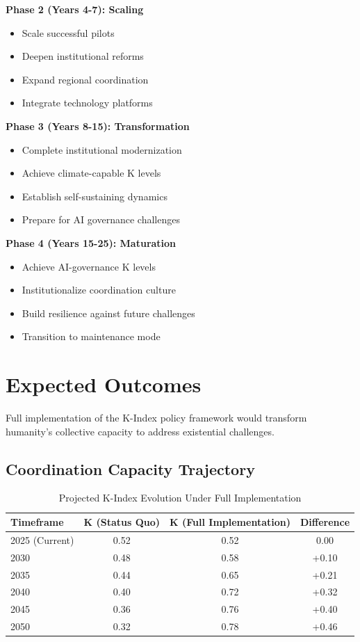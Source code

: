 \documentclass[12pt,letterpaper]{article}
\begin{document}
\textbf{Phase 2 (Years 4-7): Scaling}
\begin{itemize}
    \item Scale successful pilots
    \item Deepen institutional reforms
    \item Expand regional coordination
    \item Integrate technology platforms
\end{itemize}

\textbf{Phase 3 (Years 8-15): Transformation}
\begin{itemize}
    \item Complete institutional modernization
    \item Achieve climate-capable K levels
    \item Establish self-sustaining dynamics
    \item Prepare for AI governance challenges
\end{itemize}

\textbf{Phase 4 (Years 15-25): Maturation}
\begin{itemize}
    \item Achieve AI-governance K levels
    \item Institutionalize coordination culture
    \item Build resilience against future challenges
    \item Transition to maintenance mode
\end{itemize}

\section{Expected Outcomes}

Full implementation of the K-Index policy framework would transform humanity's collective capacity to address existential challenges.

\subsection{Coordination Capacity Trajectory}

\begin{table}[H]
\centering
\caption{Projected K-Index Evolution Under Full Implementation}
\begin{tabular}{lccc}
\toprule
\textbf{Timeframe} & \textbf{K (Status Quo)} & \textbf{K (Full Implementation)} & \textbf{Difference} \\
\midrule
2025 (Current) & 0.52 & 0.52 & 0.00 \\
2030 & 0.48 & 0.58 & +0.10 \\
2035 & 0.44 & 0.65 & +0.21 \\
2040 & 0.40 & 0.72 & +0.32 \\
2045 & 0.36 & 0.76 & +0.40 \\
2050 & 0.32 & 0.78 & +0.46 \\
\bottomrule
\end{tabular}
\end{table}
\end{document}
